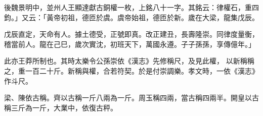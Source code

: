 \begin{pinyinscope}
 後魏景明中，並州人王顯達獻古銅權一枚，上銘八十一字。其銘云：律權石，重四鈞。」又云：「黃帝初祖，德匝於虞。虞帝始祖，德匝於新。歲在大梁，龍集戊辰。



 戊辰直定，天命有人。據土德受，正號即真。改正建丑，長壽隆崇。同律度量衡，稽當前人。龍在己巳，歲次實沈，初班天下，萬國永遵。子子孫孫，享傳億年。」



 此亦王莽所制也。其時太樂令公孫崇依《漢志》先修稱尺，及見此權，
 以新稱稱之，重一百二十斤。新稱與權，合若符契。於是付崇調樂。孝文時，一依《漢志》作斗尺。



 梁、陳依古稱。齊以古稱一斤八兩為一斤。周玉稱四兩，當古稱四兩半。開皇以古稱三斤為一斤，大業中，依復古秤。



\end{pinyinscope}